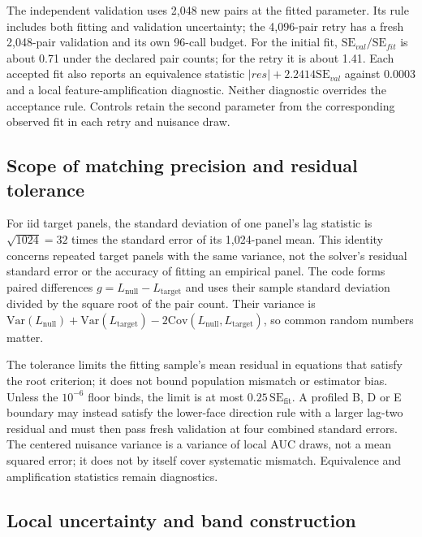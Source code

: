 The independent validation uses 2,048 new pairs at the fitted parameter. Its rule includes both fitting and validation uncertainty; the 4,096-pair retry has a fresh 2,048-pair validation and its own 96-call budget. For the initial fit, $\mathrm{SE}_{val}/\mathrm{SE}_{fit}$ is about 0.71 under the declared pair counts; for the retry it is about 1.41. Each accepted fit also reports an equivalence statistic $|res|+2.2414\mathrm{SE}_{val}$ against 0.0003 and a local feature-amplification diagnostic. Neither diagnostic overrides the acceptance rule. Controls retain the second parameter from the corresponding observed fit in each retry and nuisance draw.

\subsection*{Scope of matching precision and residual tolerance}\label{supp:matching-scope}

For iid target panels, the standard deviation of one panel's lag statistic is $\sqrt{1024}=32$ times the standard error of its 1,024-panel mean. This identity concerns repeated target panels with the same variance, not the solver's residual standard error or the accuracy of fitting an empirical panel. The code forms paired differences $g=L_{\mathrm{null}}-L_{\mathrm{target}}$ and uses their sample standard deviation divided by the square root of the pair count. Their variance is $\mathrm{Var}(L_{\mathrm{null}})+\mathrm{Var}(L_{\mathrm{target}})-2\mathrm{Cov}(L_{\mathrm{null}},L_{\mathrm{target}})$, so common random numbers matter. %

The tolerance limits the fitting sample's mean residual in equations that satisfy the root criterion; it does not bound population mismatch or estimator bias. Unless the $10^{-6}$ floor binds, the limit is at most $0.25\,\mathrm{SE}_{\mathrm{fit}}$. A profiled B, D or E boundary may instead satisfy the lower-face direction rule with a larger lag-two residual and must then pass fresh validation at four combined standard errors. The centered nuisance variance is a variance of local AUC draws, not a mean squared error; it does not by itself cover systematic mismatch. Equivalence and amplification statistics remain diagnostics. %

\subsection*{Local uncertainty and band construction}

